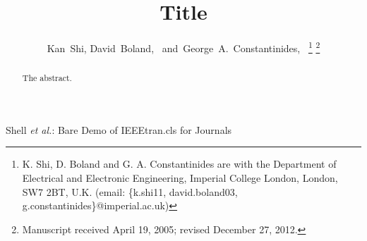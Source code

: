 \documentclass[journal]{IEEEtran}
\begin{document}
\title{Title}

\author{Kan~Shi,
        David~Boland,~
        and~George~A.~Constantinides,~%
	\thanks{K. Shi, D. Boland and G. A. Constantinides are with the Department of Electrical and Electronic Engineering, Imperial College London, London, SW7 2BT, U.K. (email: \{k.shi11, david.boland03, g.constantinides\}@imperial.ac.uk)}%
\thanks{Manuscript received April 19, 2005; revised December 27, 2012.}}

%
%



%
{Shell \MakeLowercase{\textit{et al.}}: Bare Demo of IEEEtran.cls for Journals}

\maketitle

\begin{abstract}
The abstract.
\end{abstract}
\end{document}
